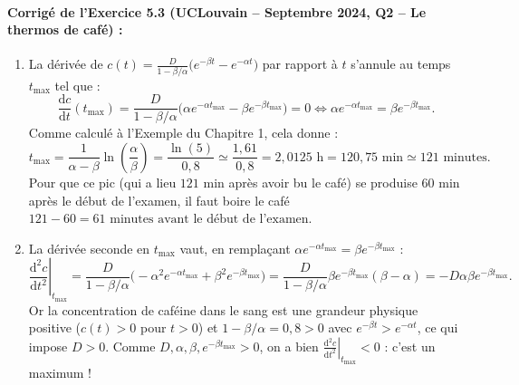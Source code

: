 \paragraph{Corrigé de l'Exercice 5.3 (UCLouvain -- Septembre 2024, Q2 -- Le thermos de café) :}
\begin{enumerate}[label=(\alph*)]
    \item La dérivée de $c(t) = \frac{D}{1-\beta/\alpha}\bigl(e^{-\beta t} - e^{-\alpha t}\bigr)$ par rapport à $t$ s'annule au temps $t_{\max}$ tel que :
    \[
        \frac{\mathrm{d}c}{\mathrm{d}t}(t_{\max}) = \frac{D}{1 - \beta/\alpha}\bigl(\alpha e^{-\alpha t_{\max}} - \beta e^{-\beta t_{\max}}\bigr) = 0 \iff \alpha e^{-\alpha t_{\max}} = \beta e^{-\beta t_{\max}}.
    \]
    Comme calculé à l'Exemple du Chapitre 1, cela donne :
    \[
        t_{\max} = \frac{1}{\alpha - \beta}\ln\left(\frac{\alpha}{\beta}\right) = \frac{\ln(5)}{0,8} \simeq \frac{1,61}{0,8} = 2,0125\text{ h} = 120,75\text{ min} \simeq 121\text{ minutes}.
    \]
    Pour que ce pic (qui a lieu $121\text{ min}$ après avoir bu le café) se produise $60\text{ min}$ après le début de l'examen, il faut boire le café $121 - 60 = \boxed{61\text{ minutes avant le début de l'examen}}$.
    \item La dérivée seconde en $t_{\max}$ vaut, en remplaçant $\alpha e^{-\alpha t_{\max}} = \beta e^{-\beta t_{\max}}$ :
    \[
        \left.\frac{\mathrm{d}^2 c}{\mathrm{d}t^2}\right|_{t_{\max}} = \frac{D}{1 - \beta/\alpha}\bigl(-\alpha^2 e^{-\alpha t_{\max}} + \beta^2 e^{-\beta t_{\max}}\bigr) = \frac{D}{1 - \beta/\alpha}\beta e^{-\beta t_{\max}}(\beta - \alpha) = -D\alpha\beta e^{-\beta t_{\max}}.
    \]
    Or la concentration de caféine dans le sang est une grandeur physique positive ($c(t) > 0$ pour $t > 0$) et $1 - \beta/\alpha = 0,8 > 0$ avec $e^{-\beta t} > e^{-\alpha t}$, ce qui impose $D > 0$. Comme $D, \alpha, \beta, e^{-\beta t_{\max}} > 0$, on a bien $\left.\frac{\mathrm{d}^2 c}{\mathrm{d}t^2}\right|_{t_{\max}} < 0$ : c'est un maximum !
\end{enumerate}

